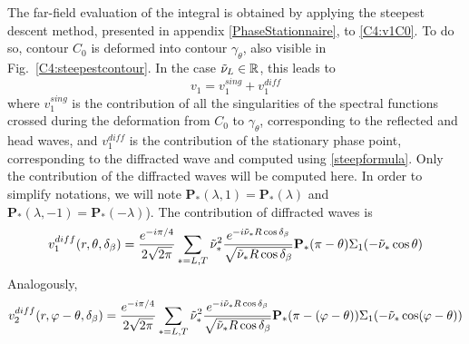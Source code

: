 The far-field evaluation of the integral is obtained by applying the steepest descent method, presented in appendix \ref{PhaseStationnaire}, to \eqref{C4:v1C0}. To do so, contour $C_0$ is deformed into contour $\gamma_{\theta}$, also visible in Fig.~\ref{C4:steepestcontour}. In the case $\tilde{\nu}_L \in \mathbb{R}$, this leads to
\begin{equation}
v_1=v_1^{sing}+v_1^{diff}
\end{equation}
where $v_1^{sing}$ is the contribution of all the singularities of the spectral functions crossed during the deformation from $C_0$ to $\gamma_{\theta}$, corresponding to the reflected and head waves, and $v_1^{diff}$ is the contribution of the stationary phase point, corresponding to the diffracted wave and computed using \eqref{steepformula}. Only the contribution of the diffracted waves will be computed here. In order to simplify notations, we will note $\mathbf{P}_*(\lambda,1)=\mathbf{P}_*(\lambda)$ and $\mathbf{P}_*(\lambda,-1)=\mathbf{P}_*(-\lambda)$). The contribution of diffracted waves is 
\begin{equation}
v_1^{diff}(r,\theta,\delta_{\beta})=\frac{e^{-i\pi/4}}{2\sqrt{2\pi}}\sum_{*=L,T}\tilde{\nu}_*^2\frac{e^{-i\tilde{\nu}_*R\cos\delta_{\beta}}}{\sqrt{\tilde{\nu}_*R\cos\delta_{\beta}}}\mathbf{P_*}(\pi-\theta)\Sigma_1(-\tilde{\nu}_*\cos\theta)
\end{equation}
Analogously,
\begin{equation}
v_2^{diff}(r,\varphi-\theta,\delta_{\beta})=\frac{e^{-i\pi/4}}{2\sqrt{2\pi}}\sum_{*=L,T}\tilde{\nu}_*^2\frac{e^{-i\tilde{\nu}_*R\cos\delta_{\beta}}}{\sqrt{\tilde{\nu}_*R\cos\delta_{\beta}}}\mathbf{P_*}(\pi-(\varphi-\theta))\Sigma_1(-\tilde{\nu}_*\cos(\varphi-\theta))
\end{equation}

